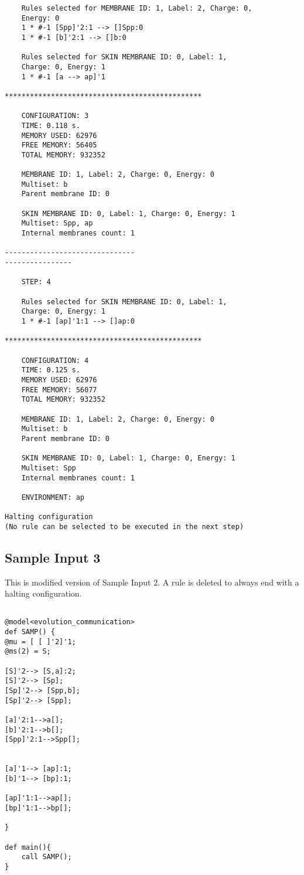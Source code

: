 \documentclass{acm_proc_article-sp}
\begin{document}
\begin{lstlisting}
    Rules selected for MEMBRANE ID: 1, Label: 2, Charge: 0, 
    Energy: 0
    1 * #-1 [Spp]'2:1 --> []Spp:0
    1 * #-1 [b]'2:1 --> []b:0

    Rules selected for SKIN MEMBRANE ID: 0, Label: 1, 
    Charge: 0, Energy: 1
    1 * #-1 [a --> ap]'1

***********************************************

    CONFIGURATION: 3
    TIME: 0.118 s.
    MEMORY USED: 62976
    FREE MEMORY: 56405
    TOTAL MEMORY: 932352

    MEMBRANE ID: 1, Label: 2, Charge: 0, Energy: 0
    Multiset: b
    Parent membrane ID: 0

    SKIN MEMBRANE ID: 0, Label: 1, Charge: 0, Energy: 1
    Multiset: Spp, ap
    Internal membranes count: 1

-------------------------------
----------------

    STEP: 4

    Rules selected for SKIN MEMBRANE ID: 0, Label: 1, 
    Charge: 0, Energy: 1
    1 * #-1 [ap]'1:1 --> []ap:0

***********************************************

    CONFIGURATION: 4
    TIME: 0.125 s.
    MEMORY USED: 62976
    FREE MEMORY: 56077
    TOTAL MEMORY: 932352

    MEMBRANE ID: 1, Label: 2, Charge: 0, Energy: 0
    Multiset: b
    Parent membrane ID: 0

    SKIN MEMBRANE ID: 0, Label: 1, Charge: 0, Energy: 1
    Multiset: Spp
    Internal membranes count: 1

    ENVIRONMENT: ap

Halting configuration 
(No rule can be selected to be executed in the next step)

\end{lstlisting}

\subsection{Sample Input 3}
This is modified version of Sample Input 2. A rule is deleted to always end with a halting configuration.
\begin{lstlisting}

@model<evolution_communication>
def SAMP() {
@mu = [ [ ]'2]'1;
@ms(2) = S;

[S]'2--> [S,a]:2;
[S]'2--> [Sp];
[Sp]'2--> [Spp,b];
[Sp]'2--> [Spp];

[a]'2:1-->a[];
[b]'2:1-->b[];
[Spp]'2:1-->Spp[];


[a]'1--> [ap]:1;
[b]'1--> [bp]:1;

[ap]'1:1-->ap[];
[bp]'1:1-->bp[];

}

def main(){
	call SAMP();
}

\end{lstlisting}
\end{document}
